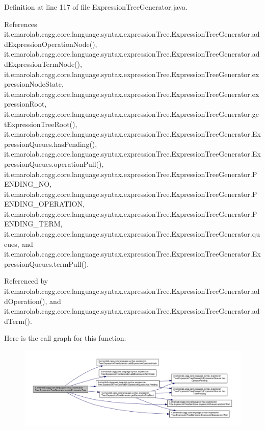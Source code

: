 Definition at line 117 of file Expression\-Tree\-Generator.\-java.



References it.\-emarolab.\-cagg.\-core.\-language.\-syntax.\-expression\-Tree.\-Expression\-Tree\-Generator.\-add\-Expression\-Operation\-Node(), it.\-emarolab.\-cagg.\-core.\-language.\-syntax.\-expression\-Tree.\-Expression\-Tree\-Generator.\-add\-Expression\-Term\-Node(), it.\-emarolab.\-cagg.\-core.\-language.\-syntax.\-expression\-Tree.\-Expression\-Tree\-Generator.\-expression\-Node\-State, it.\-emarolab.\-cagg.\-core.\-language.\-syntax.\-expression\-Tree.\-Expression\-Tree\-Generator.\-expression\-Root, it.\-emarolab.\-cagg.\-core.\-language.\-syntax.\-expression\-Tree.\-Expression\-Tree\-Generator.\-get\-Expression\-Tree\-Root(), it.\-emarolab.\-cagg.\-core.\-language.\-syntax.\-expression\-Tree.\-Expression\-Tree\-Generator.\-Expression\-Queues.\-has\-Pending(), it.\-emarolab.\-cagg.\-core.\-language.\-syntax.\-expression\-Tree.\-Expression\-Tree\-Generator.\-Expression\-Queues.\-operation\-Pull(), it.\-emarolab.\-cagg.\-core.\-language.\-syntax.\-expression\-Tree.\-Expression\-Tree\-Generator.\-P\-E\-N\-D\-I\-N\-G\-\_\-\-N\-O, it.\-emarolab.\-cagg.\-core.\-language.\-syntax.\-expression\-Tree.\-Expression\-Tree\-Generator.\-P\-E\-N\-D\-I\-N\-G\-\_\-\-O\-P\-E\-R\-A\-T\-I\-O\-N, it.\-emarolab.\-cagg.\-core.\-language.\-syntax.\-expression\-Tree.\-Expression\-Tree\-Generator.\-P\-E\-N\-D\-I\-N\-G\-\_\-\-T\-E\-R\-M, it.\-emarolab.\-cagg.\-core.\-language.\-syntax.\-expression\-Tree.\-Expression\-Tree\-Generator.\-queues, and it.\-emarolab.\-cagg.\-core.\-language.\-syntax.\-expression\-Tree.\-Expression\-Tree\-Generator.\-Expression\-Queues.\-term\-Pull().



Referenced by it.\-emarolab.\-cagg.\-core.\-language.\-syntax.\-expression\-Tree.\-Expression\-Tree\-Generator.\-add\-Operation(), and it.\-emarolab.\-cagg.\-core.\-language.\-syntax.\-expression\-Tree.\-Expression\-Tree\-Generator.\-add\-Term().



Here is the call graph for this function\-:\nopagebreak
\begin{figure}[H]
\begin{center}
\leavevmode
\includegraphics[width=350pt]{classit_1_1emarolab_1_1cagg_1_1core_1_1language_1_1syntax_1_1expressionTree_1_1ExpressionTreeGenerator_a33af243e09ff9fdafd10e8914c83009e_cgraph}
\end{center}
\end{figure}




